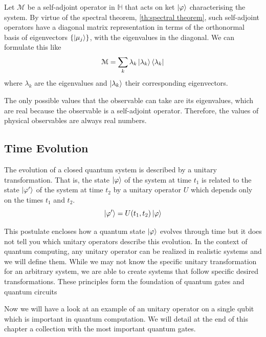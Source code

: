 Let $\mathcal{M}$ be a self-adjoint operator in $\mathbb{H}$ that acts on ket $\ket{\varphi}$ characterising the system. By virtue of the spectral theorem, \autoref{th:spectral theorem}, such self-adjoint operators have a diagonal matrix representation in terms of the orthonormal basis of eigenvectors
 $\left\lbrace \ket{\mu_j} \right\rbrace$, with the eigenvalues in the diagonal.
We can formulate this like
\begin{equation}
    \mathcal{M}=\sum_{k} \lambda_k \ket{\lambda_k} \bra{\lambda_k}
\end{equation}
where $\lambda_k$ are the eigenvalues and $\ket{\lambda_k}$ their corresponding eigenvectors. 

The only possible values that the observable can take are its eigenvalues, which are real because the observable is a self-adjoint operator. Therefore, the values of physical observables are always real numbers.

\subsection{Time Evolution}\label{sec: time evolution}

\begin{tcolorbox}[title=Postulate $3$]

    The evolution of a closed quantum system is described by a unitary transformation. That is, the state $\ket{\varphi}$ of the system at time $t_1$ is related to the state $\ket{\varphi^\prime}$ of the system at time $t_2$ by a unitary operator $U$ which depends only on the times $t_1$ and $t_2$. 
    \begin{equation}
        \ket{\varphi^\prime} = U(t_1,t_2) \ket{\varphi}
    \end{equation}
\end{tcolorbox}

This postulate encloses how a quantum state $\ket{\varphi}$ evolves through time but it does not tell you which unitary operators describe this evolution. In the context of quantum computing, any unitary operator can be realized in realistic systems and we will define them. While we may not know the specific unitary transformation for an arbitrary system, we are able to create systems that follow specific desired transformations. These principles form the foundation of quantum gates and quantum circuits

Now we will have a look at an example of an unitary operator on a single qubit which is important in quantum computation. We will detail at the end of this chapter a collection with the most important quantum gates.

